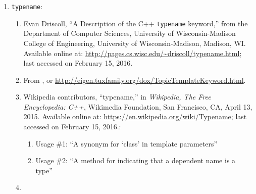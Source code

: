 \begin{enumerate}
\begin{enumerate}
\begin{enumerate}
		\item 
		\end{enumerate}
	\item : \vspace{-0.2cm}
		\begin{enumerate} \itemsep -2pt
		\item 
		\end{enumerate}
	\item : \vspace{-0.2cm}
		\begin{enumerate} \itemsep -2pt
		\item 
		\end{enumerate}
	\item : \vspace{-0.2cm}
		\begin{enumerate} \itemsep -2pt
		\item 
		\end{enumerate}
	\end{enumerate}
\item {\tt typename}: \vspace{-0.3cm}
	\begin{enumerate} \itemsep -2pt
	\item Evan Driscoll, ``A Description of the C++ {\tt typename} keyword,'' from the Department of Computer Sciences, University of Wisconsin-Madison College of Engineering, University of Wisconsin-Madison, Madison, WI. Available online at: \url{http://pages.cs.wisc.edu/~driscoll/typename.html}; last accessed on February 15, 2016.
	\item From \cite[API documentation for Eigen3: The template and typename keywords in C++]{Avery2016}, or \url{http://eigen.tuxfamily.org/dox/TopicTemplateKeyword.html}.
	\item Wikipedia contributors, ``typename,'' in {\it Wikipedia, The Free Encyclopedia: C++}, Wikimedia Foundation, San Francisco, CA, April 13, 2015. Available online at: \url{https://en.wikipedia.org/wiki/Typename}; last accessed on February 15, 2016.: \vspace{-0.2cm}
		\begin{enumerate} \itemsep -2pt
		\item Usage \#1: ``A synonym for `class' in template parameters''
		\item Usage \#2: ``A method for indicating that a dependent name is a type''
		\end{enumerate}
	\item \cite[pp. 916]{Savitch2009}

\end{enumerate}
\end{enumerate}
